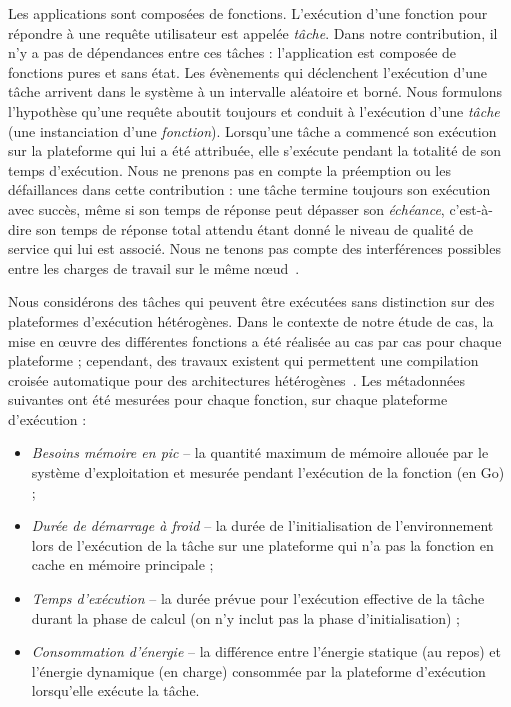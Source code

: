 Les applications sont composées de fonctions. L'exécution d'une fonction pour répondre à une requête utilisateur est appelée \textit{tâche}. Dans notre contribution, il n'y a pas de dépendances entre ces tâches : l'application est composée de fonctions pures et sans état. Les évènements qui déclenchent l'exécution d'une tâche arrivent dans le système à un intervalle aléatoire et borné. Nous formulons l'hypothèse qu'une requête aboutit toujours et conduit à l'exécution d'une \textit{tâche} (une instanciation d'une \textit{fonction}). Lorsqu'une tâche a commencé son exécution sur la plateforme qui lui a été attribuée, elle s'exécute pendant la totalité de son temps d'exécution. Nous ne prenons pas en compte la préemption ou les défaillances dans cette contribution : une tâche termine toujours son exécution avec succès, même si son temps de réponse peut dépasser son \textit{échéance}, c'est-à-dire son temps de réponse total attendu étant donné le niveau de qualité de service qui lui est associé. Nous ne tenons pas compte des interférences possibles entre les charges de travail sur le même nœud~\cite{dartoisInvestigatingMachineLearning2021}. 

Nous considérons des tâches qui peuvent être exécutées sans distinction sur des plateformes d'exécution hétérogènes. Dans le contexte de notre étude de cas, la mise en œuvre des différentes fonctions a été réalisée au cas par cas pour chaque plateforme ; cependant, des travaux existent qui permettent une compilation croisée automatique pour des architectures hétérogènes~\cite{hortaXartrekRuntimeExecution2021, 10.1145/3445814.3446699}. Les métadonnées suivantes ont été mesurées pour chaque fonction, sur chaque plateforme d'exécution :

\begin{itemize}
    \item \textit{Besoins mémoire en pic} -- la quantité maximum de mémoire allouée par le système d'exploitation et mesurée pendant l'exécution de la fonction (en Go) ;
    \item \textit{Durée de démarrage à froid} -- la durée de l'initialisation de l'environnement lors de l'exécution de la tâche sur une plateforme qui n'a pas la fonction en cache en mémoire principale ;
    \item \textit{Temps d'exécution} -- la durée prévue pour l'exécution effective de la tâche durant la phase de calcul (on n'y inclut pas la phase d'initialisation) ;
    \item \textit{Consommation d'énergie} -- la différence entre l'énergie statique (au repos) et l'énergie dynamique (en charge) consommée par la plateforme d'exécution lorsqu'elle exécute la tâche.
\end{itemize}

